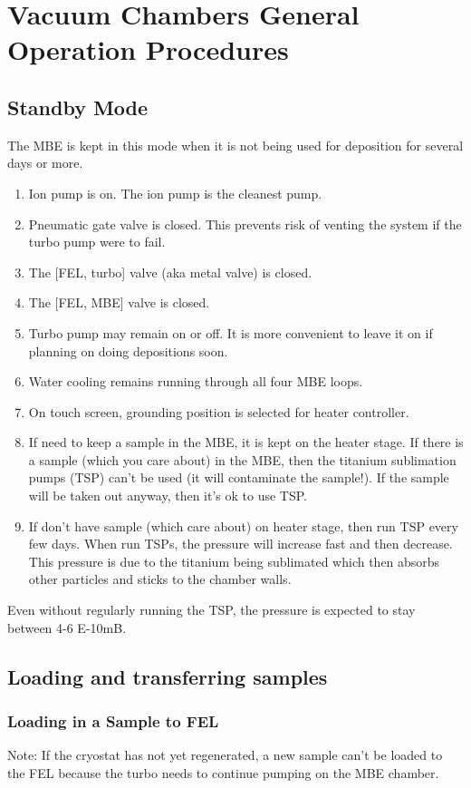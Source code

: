 
\chapter{Vacuum Chambers General Operation Procedures}
\section {Standby Mode}
The MBE is kept in this mode when it is not being used for deposition for several days or more.

\begin{enumerate}
	\item Ion pump is on. The ion pump  is the cleanest pump.
	\item Pneumatic gate valve is closed. This prevents risk of venting the system if the turbo pump were to fail.
	\item The [FEL, turbo] valve (aka metal valve) is closed.
	\item The [FEL, MBE] valve is closed.
	\item Turbo pump may remain on or off. It is more convenient to leave it on if planning on doing depositions soon.
	\item Water cooling remains running through all four MBE loops.
	\item On touch screen, grounding position is selected for heater controller.
	\item If need to keep a sample in the MBE, it is kept on the heater stage. If there is a sample (which you care about) in the MBE, then the titanium sublimation pumps (TSP) can't be used (it will contaminate the sample!). If the sample will be taken out anyway, then it's ok to use TSP.
	\item If don't have sample (which care about) on heater stage, then run TSP every few days. When run TSPs, the pressure will increase fast and then decrease. This pressure is due to the titanium being sublimated which then absorbs other particles and sticks to the chamber walls.
\end{enumerate}
Even without regularly  running the TSP, the pressure is expected to stay between 4-6 E-10mB.



\section{Loading and transferring samples}
\subsection{Loading in a Sample to FEL}
Note: If the cryostat has not yet regenerated, a new sample can't be loaded to the FEL because the turbo needs to continue pumping on the MBE chamber.

